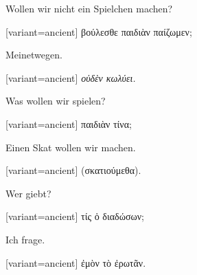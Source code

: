 Wollen wir nicht ein Spielchen machen?

\switchcolumn

\begin{greek}[variant=ancient]%
βούλεσθε παιδιὰν παίζωμεν;

\end{greek}%
\switchcolumn*

Meinetwegen.

\switchcolumn

\begin{greek}[variant=ancient]%
\emph{οὐδὲν κωλύει.}

\end{greek}%
\switchcolumn*

Was wollen wir spielen?

\switchcolumn

\begin{greek}[variant=ancient]%
παιδιὰν τίνα;

\end{greek}%
\switchcolumn*

Einen Skat wollen wir machen.

\switchcolumn

\begin{greek}[variant=ancient]%
(σκατιούμεθα).

\end{greek}%
\switchcolumn*

Wer giebt?

\switchcolumn

\begin{greek}[variant=ancient]%
τίς ὁ διαδώσων;

\end{greek}%
\switchcolumn*

Ich frage.

\switchcolumn

\begin{greek}[variant=ancient]%
ἐμὸν τὸ ἐρωτᾶν.

\end{greek}%
\switchcolumn*

